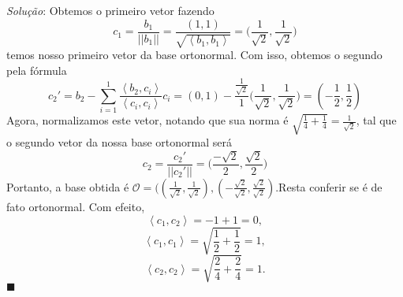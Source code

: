 \documentclass{article}
\renewcommand\qedsymbol{$\blacksquare$}
\begin{document}
\textit{Solu\c c\~ao}: Obtemos o primeiro vetor fazendo
$$
	c _{1} = \frac{b _{1}}{||b _{1}||} = \frac{(1, 1)}{\sqrt{\left< b_1, b_1 \right>}} = \biggl(\frac{1}{\sqrt{2}}, \frac{1}{\sqrt{2}}\biggr)
$$
temos nosso primeiro vetor da base ortonormal. Com isso, obtemos o segundo pela f\'ormula
$$
	c_2' = b_2 - \sum _{i=1}^{1} \frac{\left< b _{2}, c _{i} \right>}{\left< c _{i}, c _{i} \right>}c _{i} =
	(0, 1) - \frac{\frac{1}{\sqrt{2}}}{1}\biggl(\frac{1}{\sqrt{2}}, \frac{1}{\sqrt{2}}\biggr) = (-\frac{1}{2}, \frac{1}{2})
$$
Agora, normalizamos este vetor, notando que sua norma \'e $\sqrt{\frac{1}{4} + \frac{1}{4}} = \frac{1}{\sqrt{2}}$, tal que
o segundo vetor da nossa base ortonormal ser\'a
$$
	c _{2} = \frac{c _{2}'}{||c _{2}'||} = \biggl(\frac{-\sqrt{2}}{2}, \frac{\sqrt{2}}{2}\biggr)
$$
Portanto, a base obtida \'e $\mathcal{O} = ((\frac{1}{\sqrt{2}}, \frac{1}{\sqrt{2}}), (-\frac{\sqrt{2}}{\sqrt{2}}, \frac{\sqrt{2}}{\sqrt{2}})$.Resta conferir se \'e de fato ortonormal. Com efeito,
$$
	\left< c _{1}, c _{2} \right> = -1 + 1 = 0,
$$
$$
	\left< c _{1}, c _{1} \right> = \sqrt{\frac{1}{2} + \frac{1}{2}} = 1,
$$
$$
	\left< c _{2}, c _{2} \right> = \sqrt{\frac{2}{4} + \frac{2}{4}} = 1.
$$
\qedsymbol
\end{document}
